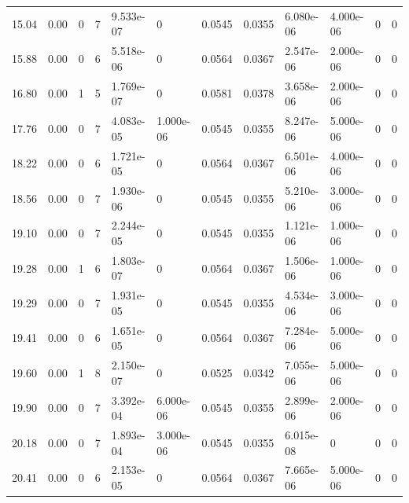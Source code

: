 \documentclass[preview]{standalone}
\begin{document}
{{\begin{tabular}{L{1.2cm}C{1.2cm} C{0.3cm}C{0.5cm} C{1.4cm}C{1.4cm} C{1.4cm}C{1.4cm} C{1.6cm}C{1.6cm} C{1.6cm}C{1.6cm}}
  15.04  &  0.00  & 0     &  7 &  9.533e-07  & 0  &  0.0545&   0.0355& 6.080e-06 & 4.000e-06   &  0 & 0  \\ 
  15.88  &  0.00  & 0     &  6 &  5.518e-06  & 0  &  0.0564&   0.0367& 2.547e-06 & 2.000e-06   &  0 & 0  \\ 
  16.80  &  0.00  & 1     &  5 &  1.769e-07  & 0  &  0.0581&   0.0378& 3.658e-06 & 2.000e-06   &  0 & 0  \\ 
  17.76  &  0.00  & 0     &  7 &  4.083e-05  & 1.000e-06  &  0.0545&   0.0355& 8.247e-06 & 5.000e-06   &  0 & 0  \\ 
  18.22  &  0.00  & 0     &  6 &  1.721e-05  & 0  &  0.0564&   0.0367& 6.501e-06 & 4.000e-06   &  0 & 0  \\ 
  18.56  &  0.00  & 0     &  7 &  1.930e-06  & 0  &  0.0545&   0.0355& 5.210e-06 & 3.000e-06   &  0 & 0  \\ 
  19.10  &  0.00  & 0     &  7 &  2.244e-05  & 0  &  0.0545&   0.0355& 1.121e-06 & 1.000e-06   &  0 & 0  \\ 
  19.28  &  0.00  & 1     &  6 &  1.803e-07  & 0  &  0.0564&   0.0367& 1.506e-06 & 1.000e-06   &  0 & 0  \\ 
  19.29  &  0.00  & 0     &  7 &  1.931e-05  & 0  &  0.0545&   0.0355& 4.534e-06 & 3.000e-06   &  0 & 0  \\ 
  19.41  &  0.00  & 0     &  6 &  1.651e-05  & 0  &  0.0564&   0.0367& 7.284e-06 & 5.000e-06   &  0 & 0  \\ 
  19.60  &  0.00  & 1     &  8 &  2.150e-07  & 0  &  0.0525&   0.0342& 7.055e-06 & 5.000e-06   &  0 & 0  \\ 
  19.90  &  0.00  & 0     &  7 &  3.392e-04  & 6.000e-06  &  0.0545&   0.0355& 2.899e-06 & 2.000e-06   &  0 & 0  \\ 
  20.18  &  0.00  & 0     &  7 &  1.893e-04  & 3.000e-06  &  0.0545&   0.0355& 6.015e-08 & 0   &  0 & 0  \\ 
  20.41  &  0.00  & 0     &  6 &  2.153e-05  & 0  &  0.0564&   0.0367& 7.665e-06 & 5.000e-06   &  0 & 0  \\ 
\hline 
\end{tabular} 

}}
\end{document}

